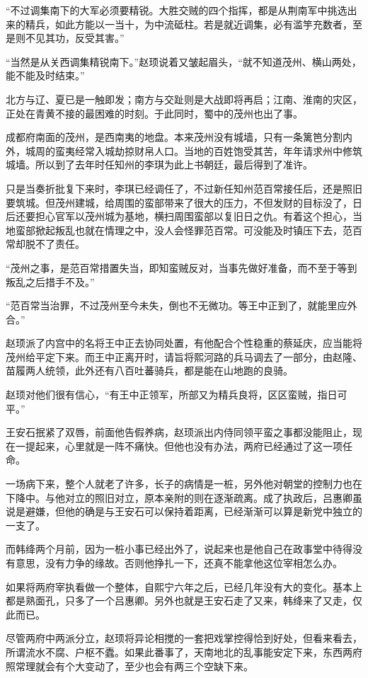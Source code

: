 “不过调集南下的大军必须要精锐。大胜交贼的四个指挥，都是从荆南军中挑选出来的精兵，如此方能以一当十，为中流砥柱。若是就近调集，必有滥竽充数者，至是则不见其功，反受其害。”

“当然是从关西调集精锐南下。”赵顼说着又皱起眉头，“就不知道茂州、横山两处，能不能及时结束。”

北方与辽、夏已是一触即发；南方与交趾则是大战即将再启；江南、淮南的灾区，正处在青黄不接的最困难的时刻。于此同时，蜀中的茂州也出了事。

成都府南面的茂州，是西南夷的地盘。本来茂州没有城墙，只有一条篱笆分割内外，城周的蛮夷经常入城劫掠财帛人口。当地的百姓饱受其苦，年年请求州中修筑城墙。所以到了去年时任知州的李琪为此上书朝廷，最后得到了准许。

只是当奏折批复下来时，李琪已经调任了，不过新任知州范百常接任后，还是照旧要筑城。但茂州建城，给周围的蛮部带来了很大的压力，不但发财的目标没了，日后还要担心官军以茂州城为基地，横扫周围蛮部以复旧日之仇。有着这个担心，当地蛮部掀起叛乱也就在情理之中，没人会怪罪范百常。可没能及时镇压下去，范百常却脱不了责任。

“茂州之事，是范百常措置失当，即知蛮贼反对，当事先做好准备，而不至于等到叛乱之后措手不及。”

“范百常当治罪，不过茂州至今未失，倒也不无微功。等王中正到了，就能里应外合。”

赵顼派了内宫中的名将王中正去协同处置，有他配合个性稳重的蔡延庆，应当能将茂州给平定下来。而王中正离开时，请旨将熙河路的兵马调去了一部分，由赵隆、苗履两人统领，此外还有八百吐蕃骑兵，都是能在山地跑的良骑。

赵顼对他们很有信心，“有王中正领军，所部又为精兵良将，区区蛮贼，指日可平。”

王安石抿紧了双唇，前面他告假养病，赵顼派出内侍同领平蛮之事都没能阻止，现在一提起来，心里就是一阵不痛快。但他也没有办法，两府已经通过了这一项任命。

一场病下来，整个人就老了许多，长子的病情是一桩，另外他对朝堂的控制力也在下降中。与他对立的照旧对立，原本亲附的则在逐渐疏离。成了执政后，吕惠卿虽说是避嫌，但他的确是与王安石可以保持着距离，已经渐渐可以算是新党中独立的一支了。

而韩绛两个月前，因为一桩小事已经出外了，说起来也是他自己在政事堂中待得没有意思，没有力争的缘故。否则他挣扎一下，还真不能拿他这位宰相怎么办。

如果将两府宰执看做一个整体，自熙宁六年之后，已经几年没有大的变化。基本上都是熟面孔，只多了一个吕惠卿。另外也就是王安石走了又来，韩绛来了又走，仅此而已。

尽管两府中两派分立，赵顼将异论相搅的一套把戏掌控得恰到好处，但看来看去，所谓流水不腐、户枢不蠹。如果此番事了，天南地北的乱事能安定下来，东西两府照常理就会有个大变动了，至少也会有两三个空缺下来。

